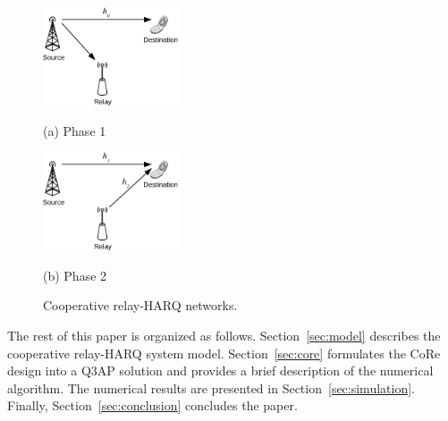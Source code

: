 \documentclass[conference]{IEEEtran}
\begin{document}
\begin{figure}[!t]
    \begin{minipage}[b]{0.48\linewidth}
      \centering
      \centerline{\includegraphics[width=4.0cm]{./figs/relayHARQ1.eps}}
      \centerline{(a) Phase 1}\medskip
    \end{minipage}
    \hfill
    \begin{minipage}[b]{.48\linewidth}
      \centering
      \centerline{\includegraphics[width=4.0cm]{./figs/relayHARQ2.eps}}
      \centerline{(b) Phase 2}\medskip
    \end{minipage}
    \caption{Cooperative relay-HARQ networks.}
    \label{fig:system_model}
\end{figure}

The rest of this paper is organized as follows. Section~\ref{sec:model}
describes the cooperative relay-HARQ system model. Section~\ref{sec:core}
formulates the CoRe design into a Q3AP solution and provides a brief description
of the numerical algorithm. The numerical results are presented in
Section~\ref{sec:simulation}. Finally, Section~\ref{sec:conclusion} concludes
the paper.
\end{document}
